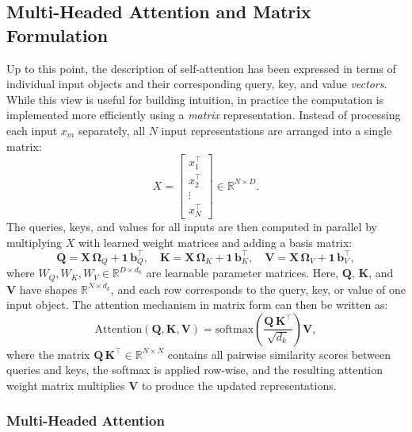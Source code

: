\subsection{Multi-Headed Attention and Matrix Formulation}
Up to this point, the description of self-attention has been expressed in terms of individual input objects and their corresponding query, key, and value \emph{vectors}. 
While this view is useful for building intuition, in practice the computation is implemented more efficiently using a \emph{matrix} representation. 
Instead of processing each input $x_m$ separately, all $N$ input representations are arranged into a single matrix:
\begin{equation}
X = 
\begin{bmatrix}
x_1^\top \\
x_2^\top \\
\vdots \\
x_N^\top
\end{bmatrix}
\in \mathbb{R}^{N \times D}.
\end{equation}
The queries, keys, and values for all inputs are then computed in parallel by multiplying $X$ with learned weight matrices and adding a basis matrix:
\begin{equation}
\mathbf{Q} = \mathbf{X} \, \mathbf{\Omega}_Q + \mathbf{1} \, \mathbf{b}_Q^\top, \quad
\mathbf{K} = \mathbf{X} \, \mathbf{\Omega}_K + \mathbf{1} \, \mathbf{b}_K^\top, \quad
\mathbf{V} = \mathbf{X} \, \mathbf{\Omega}_V + \mathbf{1} \, \mathbf{b}_V^\top,
\end{equation}
where $W_Q, W_K, W_V \in \mathbb{R}^{D \times d_k}$ are learnable parameter matrices. 
Here, $\mathbf{Q}$, $\mathbf{K}$, and $\mathbf{V}$ have shapes $\mathbb{R}^{N \times d_k}$, and each row corresponds to the query, key, or value of one input object. The attention mechanism in matrix form can then be written as:
\begin{equation}
\mathrm{Attention}(\mathbf{Q}, \mathbf{K}, \mathbf{V}) = \mathrm{softmax} \left( \frac{\mathbf{Q} \, \mathbf{K}^\top}{\sqrt{d_k}} \right) \mathbf{V},
\end{equation}
where the matrix $\mathbf{Q} \, \mathbf{K}^\top \in \mathbb{R}^{N \times N}$ contains all pairwise similarity scores between queries and keys, the softmax is applied row-wise, and the resulting attention weight matrix multiplies $\mathbf{V}$ to produce the updated representations.

\subsubsection{Multi-Headed Attention}

